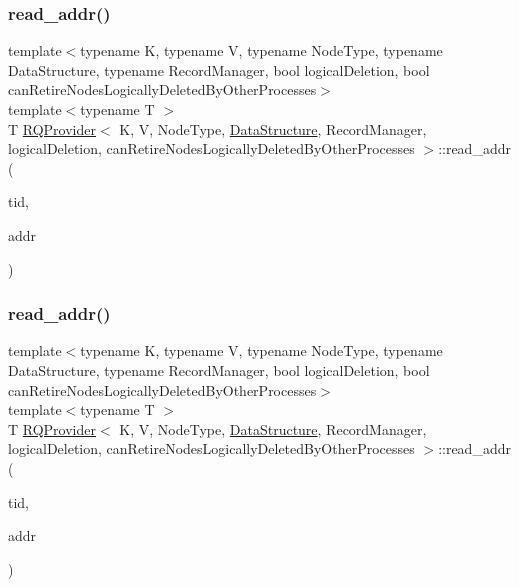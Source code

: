 \mbox{\label{classRQProvider_aa6dcae307b83ce0dc7890155f81659a2}} 
\subsubsection{\texorpdfstring{read\+\_\+addr()}{read\_addr()}\hspace{0.1cm}{\footnotesize\ttfamily [2/5]}}
{\footnotesize\ttfamily template$<$typename K, typename V, typename Node\+Type, typename Data\+Structure, typename Record\+Manager, bool logical\+Deletion, bool can\+Retire\+Nodes\+Logically\+Deleted\+By\+Other\+Processes$>$ \\
template$<$typename T $>$ \\
T \hyperlink{classRQProvider}{R\+Q\+Provider}$<$ K, V, Node\+Type, \hyperlink{classDataStructure}{Data\+Structure}, Record\+Manager, logical\+Deletion, can\+Retire\+Nodes\+Logically\+Deleted\+By\+Other\+Processes $>$\+::read\+\_\+addr (\begin{DoxyParamCaption}\item[{const int}]{tid,  }\item[{T volatile $\ast$const}]{addr }\end{DoxyParamCaption})\hspace{0.3cm}{\ttfamily [inline]}}

\mbox{\label{classRQProvider_aa6dcae307b83ce0dc7890155f81659a2}} 
\subsubsection{\texorpdfstring{read\+\_\+addr()}{read\_addr()}\hspace{0.1cm}{\footnotesize\ttfamily [3/5]}}
{\footnotesize\ttfamily template$<$typename K, typename V, typename Node\+Type, typename Data\+Structure, typename Record\+Manager, bool logical\+Deletion, bool can\+Retire\+Nodes\+Logically\+Deleted\+By\+Other\+Processes$>$ \\
template$<$typename T $>$ \\
T \hyperlink{classRQProvider}{R\+Q\+Provider}$<$ K, V, Node\+Type, \hyperlink{classDataStructure}{Data\+Structure}, Record\+Manager, logical\+Deletion, can\+Retire\+Nodes\+Logically\+Deleted\+By\+Other\+Processes $>$\+::read\+\_\+addr (\begin{DoxyParamCaption}\item[{const int}]{tid,  }\item[{T volatile $\ast$const}]{addr }\end{DoxyParamCaption})\hspace{0.3cm}{\ttfamily [inline]}}

